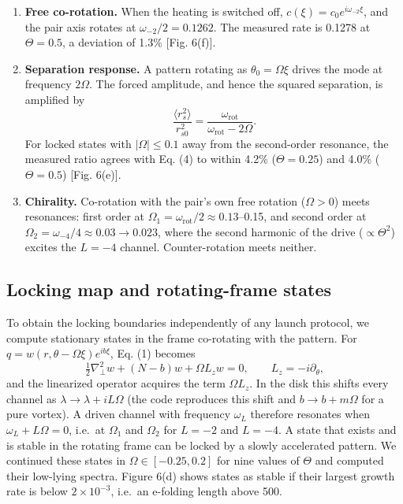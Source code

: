 \begin{enumerate}
\def\labelenumi{\arabic{enumi}.}
\tightlist
\item
  \textbf{Free co-rotation.} When the heating is switched off, \(c(\xi) = c_0 e^{i \omega_{-2} \xi}\), and the pair axis rotates at \(\omega_{-2}/2 = 0.1262\). The measured rate is 0.1278 at \(\Theta = 0.5\), a deviation of 1.3\% {[}Fig. 6(f){]}.
\item
  \textbf{Separation response.} A pattern rotating as \(\theta_0 = \Omega\xi\) drives the mode at frequency \(2\Omega\). The forced amplitude, and hence the squared separation, is amplified by
  \[ \frac{\langle r_s^2 \rangle}{r_{s0}^2} = \frac{\omega_\mathrm{rot}}{\omega_\mathrm{rot} - 2\Omega}. \tag{4} \]
  For locked states with \(|\Omega| \le 0.1\) away from the second-order resonance, the measured ratio agrees with Eq. (4) to within 4.2\% (\(\Theta = 0.25\)) and 4.0\% (\(\Theta = 0.5\)) {[}Fig. 6(e){]}.
\item
  \textbf{Chirality.} Co-rotation with the pair's own free rotation (\(\Omega > 0\)) meets resonances: first order at \(\Omega_1 = \omega_\mathrm{rot}/2 \approx 0.13\)--0.15, and second order at \(\Omega_2 = \omega_{-4}/4 \approx 0.03 \to 0.023\), where the second harmonic of the drive (\(\propto \Theta^2\)) excites the \(L = -4\) channel. Counter-rotation meets neither.
\end{enumerate}

\hypertarget{locking-map-and-rotating-frame-states}{%
\subsection{Locking map and rotating-frame states}\label{locking-map-and-rotating-frame-states}}

To obtain the locking boundaries independently of any launch protocol, we compute stationary states in the frame co-rotating with the pattern. For \(q = w(r, \theta - \Omega\xi) e^{i b \xi}\), Eq. (1) becomes
\[
\tfrac12 \nabla_\perp^2 w + (N - b) w + \Omega L_z w = 0, \qquad L_z = -i\partial_\theta ,
\tag{5}
\]
and the linearized operator acquires the term \(\Omega L_z\). In the disk this shifts every channel as \(\lambda \to \lambda + i L \Omega\) (the code reproduces this shift and \(b \to b + m\Omega\) for a pure vortex). A driven channel with frequency \(\omega_L\) therefore resonates when \(\omega_L + L\Omega = 0\), i.e.~at \(\Omega_1\) and \(\Omega_2\) for \(L = -2\) and \(L = -4\). A state that exists and is stable in the rotating frame can be locked by a slowly accelerated pattern. We continued these states in \(\Omega \in [-0.25, 0.2]\) for nine values of \(\Theta\) and computed their low-lying spectra. Figure 6(d) shows states as stable if their largest growth rate is below \(2\times10^{-3}\), i.e.~an e-folding length above 500.


